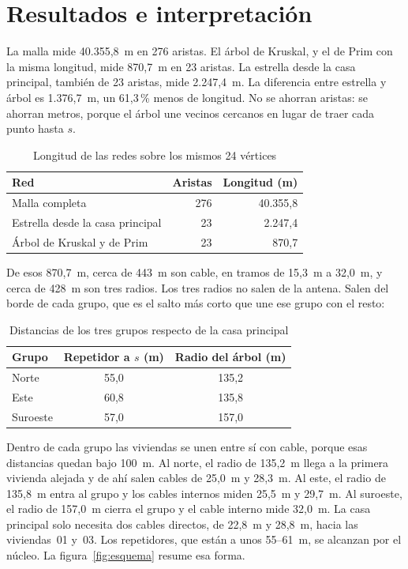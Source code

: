\documentclass[12pt,a4paper]{article}
\begin{document}
\section{Resultados e interpretación}

La malla mide 40.355,8~m en 276 aristas. El árbol de Kruskal, y el de Prim con la misma longitud, mide 870,7~m en 23 aristas. La estrella desde la casa principal, también de 23 aristas, mide 2.247,4~m. La diferencia entre estrella y árbol es 1.376,7~m, un 61,3\,\% menos de longitud. No se ahorran aristas: se ahorran metros, porque el árbol une vecinos cercanos en lugar de traer cada punto hasta \(s\).

\begin{table}[ht]
  \centering
  \caption{Longitud de las redes sobre los mismos 24 vértices}
  \label{tab:longitud}
  \begin{tabular}{lrr}
    \toprule
    Red & Aristas & Longitud (m) \\
    \midrule
    Malla completa & 276 & 40.355,8 \\
    Estrella desde la casa principal & 23 & 2.247,4 \\
    Árbol de Kruskal y de Prim & 23 & 870,7 \\
    \bottomrule
  \end{tabular}
\end{table}

De esos 870,7~m, cerca de 443~m son cable, en tramos de 15,3~m a 32,0~m, y cerca de 428~m son tres radios. Los tres radios no salen de la antena. Salen del borde de cada grupo, que es el salto más corto que une ese grupo con el resto:

\begin{table}[ht]
  \centering
  \caption{Distancias de los tres grupos respecto de la casa principal}
  \label{tab:grupos}
  \begin{tabular}{lcc}
    \toprule
    Grupo & Repetidor a \(s\) (m) & Radio del árbol (m) \\
    \midrule
    Norte & 55,0 & 135,2 \\
    Este & 60,8 & 135,8 \\
    Suroeste & 57,0 & 157,0 \\
    \bottomrule
  \end{tabular}
\end{table}

Dentro de cada grupo las viviendas se unen entre sí con cable, porque esas distancias quedan bajo 100~m. Al norte, el radio de 135,2~m llega a la primera vivienda alejada y de ahí salen cables de 25,0~m y 28,3~m. Al este, el radio de 135,8~m entra al grupo y los cables internos miden 25,5~m y 29,7~m. Al suroeste, el radio de 157,0~m cierra el grupo y el cable interno mide 32,0~m. La casa principal solo necesita dos cables directos, de 22,8~m y 28,8~m, hacia las viviendas~01 y~03. Los repetidores, que están a unos 55--61~m, se alcanzan por el núcleo. La figura~\ref{fig:esquema} resume esa forma.
\end{document}
